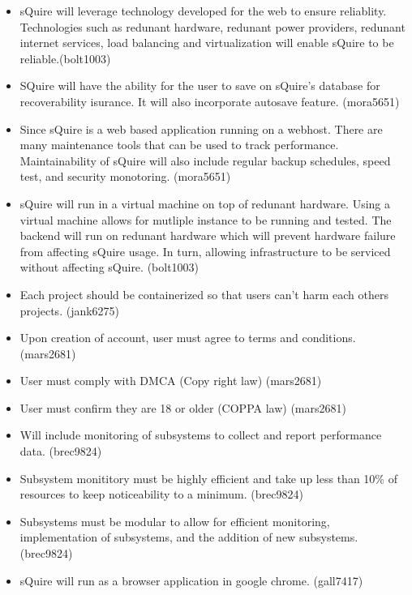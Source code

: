 \documentclass[11pt]{report}
\begin{document}
\begin{itemize}
        \item sQuire will leverage technology developed for the web to ensure reliablity. Technologies such as redunant hardware, redunant power providers, redunant internet services, load balancing and virtualization will enable sQuire to be reliable.(bolt1003)
        \item SQuire will have the ability for the user to save on sQuire's database for recoverability isurance. It will also incorporate autosave feature. (mora5651)
        \item Since sQuire is a web based application running on a webhost. There are 
        many maintenance tools that can be used to track performance. Maintainability of sQuire will also include regular backup schedules, speed test, and security monotoring. (mora5651)
        \item sQuire will run in a virtual machine on top of redunant hardware. Using a virtual machine allows for mutliple instance to be running and tested. The backend will run on redunant hardware which will prevent hardware failure from affecting sQuire usage. In turn, allowing infrastructure to be serviced without affecting sQuire. (bolt1003)
        \item Each project should be containerized so that users can't harm each others projects. (jank6275)
        \item Upon creation of account, user must agree to terms and conditions. (mars2681)
        \item User must comply with DMCA (Copy right law) (mars2681)
        \item User must confirm they are 18 or older (COPPA law) (mars2681)
        \item Will include monitoring of subsystems to collect and report performance data. (brec9824)
        \item Subsystem monititory must be highly efficient and take up less than 10\% of resources to keep noticeability to a minimum. (brec9824)
        \item Subsystems must be modular to allow for efficient monitoring, implementation of subsystems, and the addition of new subsystems. (brec9824)
        \item sQuire will run as a browser application in google chrome. (gall7417)

\end{itemize}
\end{document}
